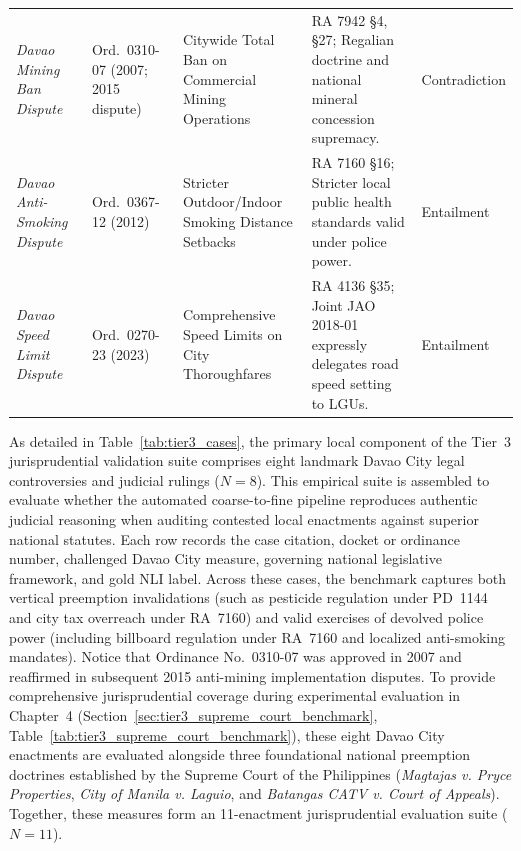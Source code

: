 \begin{table}[!htbp]
\begin{tabularx}{\linewidth}{>{\RaggedRight\arraybackslash}p{2.35cm}>{\centering\arraybackslash}p{1.75cm}>{\RaggedRight\arraybackslash}p{2.8cm}>{\RaggedRight\arraybackslash}X>{\centering\arraybackslash}p{2.2cm}}
            \addlinespace[2pt]
            \textit{Davao Mining Ban Dispute}~\cite{spdavao2007ord0310} & Ord.~0310-07 \newline (2007; 2015 dispute) & Citywide Total Ban on Commercial Mining Operations & RA 7942 §4, §27; Regalian doctrine and national mineral concession supremacy. & Contradiction \\
            \addlinespace[2pt]
            \textit{Davao Anti-Smoking Dispute}~\cite{spdavao2012ord0367} & Ord.~0367-12 \newline (2012) & Stricter Outdoor/Indoor Smoking Distance Setbacks & RA 7160 §16; Stricter local public health standards valid under police power. & Entailment \\
            \addlinespace[2pt]
            \textit{Davao Speed Limit Dispute}~\cite{spdavao2023ord0270} & Ord.~0270-23 \newline (2023) & Comprehensive Speed Limits on City Thoroughfares & RA 4136 §35; Joint JAO 2018-01 expressly delegates road speed setting to LGUs. & Entailment \\
            \bottomrule
        \end{tabularx}
    \end{table}

    As detailed in Table~\ref{tab:tier3_cases}, the primary local component of the Tier~3 jurisprudential validation suite comprises eight landmark Davao City legal controversies and judicial rulings ($N = 8$). This empirical suite is assembled to evaluate whether the automated coarse-to-fine pipeline reproduces authentic judicial reasoning when auditing contested local enactments against superior national statutes. Each row records the case citation, docket or ordinance number, challenged Davao City measure, governing national legislative framework, and gold NLI label. Across these cases, the benchmark captures both vertical preemption invalidations (such as pesticide regulation under PD~1144 and city tax overreach under RA~7160) and valid exercises of devolved police power (including billboard regulation under RA~7160 and localized anti-smoking mandates). Notice that Ordinance No.~0310-07 was approved in 2007 and reaffirmed in subsequent 2015 anti-mining implementation disputes. To provide comprehensive jurisprudential coverage during experimental evaluation in Chapter~4 (Section~\ref{sec:tier3_supreme_court_benchmark}, Table~\ref{tab:tier3_supreme_court_benchmark}), these eight Davao City enactments are evaluated alongside three foundational national preemption doctrines established by the Supreme Court of the Philippines (\textit{Magtajas v. Pryce Properties}, \textit{City of Manila v. Laguio}, and \textit{Batangas CATV v. Court of Appeals}). Together, these measures form an 11-enactment jurisprudential evaluation suite ($N = 11$).

